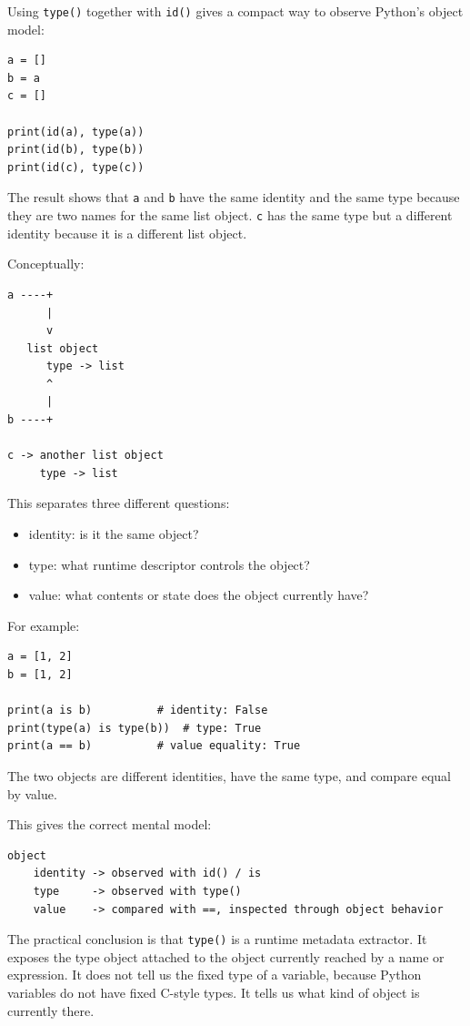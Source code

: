 Using \texttt{type()} together with \texttt{id()} gives a compact way to observe Python's object model:

\begin{verbatim}
a = []
b = a
c = []

print(id(a), type(a))
print(id(b), type(b))
print(id(c), type(c))
\end{verbatim}

The result shows that \texttt{a} and \texttt{b} have the same identity and the same type because they are two names for the same list object. \texttt{c} has the same type but a different identity because it is a different list object.

Conceptually:

\begin{verbatim}
a ----+
      |
      v
   list object
      type -> list
      ^
      |
b ----+

c -> another list object
     type -> list
\end{verbatim}

This separates three different questions:

\begin{itemize}
    \item identity: is it the same object?
    \item type: what runtime descriptor controls the object?
    \item value: what contents or state does the object currently have?
\end{itemize}

For example:

\begin{verbatim}
a = [1, 2]
b = [1, 2]

print(a is b)          # identity: False
print(type(a) is type(b))  # type: True
print(a == b)          # value equality: True
\end{verbatim}

The two objects are different identities, have the same type, and compare equal by value.

This gives the correct mental model:

\begin{verbatim}
object
    identity -> observed with id() / is
    type     -> observed with type()
    value    -> compared with ==, inspected through object behavior
\end{verbatim}

The practical conclusion is that \texttt{type()} is a runtime metadata extractor. It exposes the type object attached to the object currently reached by a name or expression. It does not tell us the fixed type of a variable, because Python variables do not have fixed C-style types. It tells us what kind of object is currently there.

